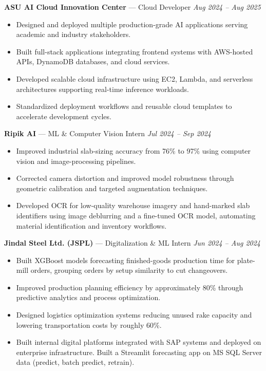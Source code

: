 \documentclass[a4paper,8pt]{extarticle}
\begin{document}
\noindent
\textbf{ASU AI Cloud Innovation Center} --- Cloud Developer
\hfill \textit{Aug 2024 -- Aug 2025}

\begin{itemize}
\item Designed and deployed multiple production-grade AI applications serving academic and industry stakeholders.
\item Built full-stack applications integrating frontend systems with AWS-hosted APIs, DynamoDB databases, and cloud services.
\item Developed scalable cloud infrastructure using EC2, Lambda, and serverless architectures supporting real-time inference workloads.
\item Standardized deployment workflows and reusable cloud templates to accelerate development cycles.
\end{itemize}

\noindent
\textbf{Ripik AI} --- ML \& Computer Vision Intern
\hfill \textit{Jul 2024 -- Sep 2024}

\begin{itemize}
\item Improved industrial slab-sizing accuracy from 76\% to 97\% using computer vision and image-processing pipelines.
\item Corrected camera distortion and improved model robustness through geometric calibration and targeted augmentation techniques.
\item Developed OCR for low-quality warehouse imagery and hand-marked slab identifiers using image deblurring and a fine-tuned OCR model, automating material identification and inventory workflows.
\end{itemize}

\noindent
\textbf{Jindal Steel Ltd. (JSPL)} --- Digitalization \& ML Intern
\hfill \textit{Jun 2024 -- Aug 2024}

\begin{itemize}
\item Built XGBoost models forecasting finished-goods production time for plate-mill orders, grouping orders by setup similarity to cut changeovers.
\item Improved production planning efficiency by approximately 80\% through predictive analytics and process optimization.
\item Designed logistics optimization systems reducing unused rake capacity and lowering transportation costs by roughly 60\%.
\item Built internal digital platforms integrated with SAP systems and deployed on enterprise infrastructure. Built a Streamlit forecasting app on MS SQL Server data (predict, batch predict, retrain).
\end{itemize}
\end{document}
